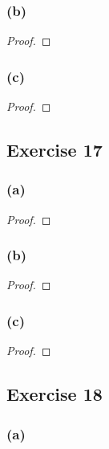 \documentclass[14pt]{extarticle}
\begin{document}
\subsubsection{(b)}

\begin{proof}

\end{proof}

\subsubsection{(c)}

\begin{proof}

\end{proof}

\subsection{Exercise 17}
\subsubsection{(a)}

\begin{proof}

\end{proof}

\subsubsection{(b)}

\begin{proof}

\end{proof}

\subsubsection{(c)}

\begin{proof}

\end{proof}

\subsection{Exercise 18}

\subsubsection{(a)}
\end{document}
